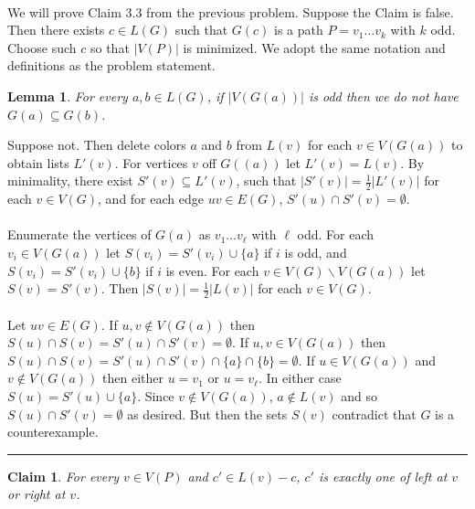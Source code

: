 \documentclass[letterpaper,12pt,oneside,onecolumn]{article}
\newenvironment{proof}{{\bf Proof:  }}{\hfill\rule{2mm}{2mm}}
\newtheorem{lemma}[fact]{Lemma}
\newtheorem{claim}[fact]{Claim}
\begin{document}
\paragraph{}
We will prove Claim $3.3$ from the previous problem. Suppose the Claim is false. Then there exists $c \in L(G)$  such that $G(c)$ is a path $P=v_1\dots v_k$ with $k$ odd. Choose such $c$ so that $|V(P)|$ is minimized. We adopt the same notation and definitions as the problem statement.
\begin{lemma}
	For every $a,b \in L(G)$, if $|V(G(a))|$ is odd then we do not have $G(a) \subseteq G(b)$.
\end{lemma}
\begin{proof}
	Suppose not. Then delete colors $a$ and $b$ from $L(v)$ for each $v \in V(G(a))$ to obtain lists $L'(v)$. For vertices $v$ off $G((a))$ let $L'(v) = L(v)$.  By minimality, there exist $S'(v) \subseteq L'(v)$, such that $|S'(v)| = \frac{1}{2}|L'(v)|$ for each $v \in V(G)$, and for each edge $uv \in E(G)$, $S'(u) \cap S'(v) = \emptyset$.
	\paragraph{}
	Enumerate the vertices of $G(a)$ as $v_1 \dots v_\ell$ with $\ell$ odd. For each $v_i \in V(G(a))$ let $S(v_i) = S'(v_i) \cup \{a\}$ if $i$ is odd, and $S(v_i) = S'(v_i) \cup \{b\}$ if $i$ is even. For each $v \in V(G)\backslash V(G(a))$ let $S(v) = S'(v)$. Then $|S(v)| = \frac{1}{2} |L(v)|$ for each $v \in V(G)$. 
	\paragraph{}
	Let $uv \in E(G)$. If $u,v \not\in V(G(a))$ then $S(u) \cap S(v) = S'(u) \cap S'(v) = \emptyset$. If $u,v \in V(G(a))$ then $S(u) \cap S(v) = S'(u) \cap S'(v) \cap \{a\} \cap \{b\} = \emptyset$. If $u \in V(G(a))$ and $v \not\in V(G(a))$ then either $u = v_1$ or $u = v_\ell$. In either case $S(u) = S'(u) \cup \{a\}$. Since $v \not\in V(G(a))$, $a \not\in L(v)$ and so $S(u) \cap S'(v) = \emptyset$ as desired. But then the sets $S(v)$ contradict that $G$ is a counterexample.
\end{proof}
\begin{claim}
	For every $v \in V(P)$ and $c' \in L(v) -c$, $c'$ is exactly one of left at $v$ or right at $v$.
\end{claim}
\end{document}
